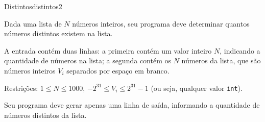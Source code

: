 \documentclass[12pt,a4paper,oneside]{article}
\begin{document}
\begin{problem}{Distintos}{distintos}{2}
 
Dada uma lista de $N$ números inteiros, seu programa deve determinar quantos números distintos existem na lista.

%

\InputFile

A entrada contém duas linhas: a primeira contém um valor inteiro $N$, indicando a quantidade de números na lista; a segunda contém os $N$ números da lista, que são números inteiros $V_i$ separados por espaço em branco.

Restrições: $1 \leq N \leq 1000$, $-2^{31} \leq V_i \leq 2^{31}-1$ (ou seja, qualquer valor \texttt{int}).



\OutputFile

Seu programa deve gerar apenas uma linha de saída, informando a quantidade de números distintos da lista.


\Example

\begin{example}
%
\end{example}

\begin{example}
%
\end{example}

\begin{example}
%
\end{example}

\begin{example}
%
\end{example}


\end{problem}
\end{document}
